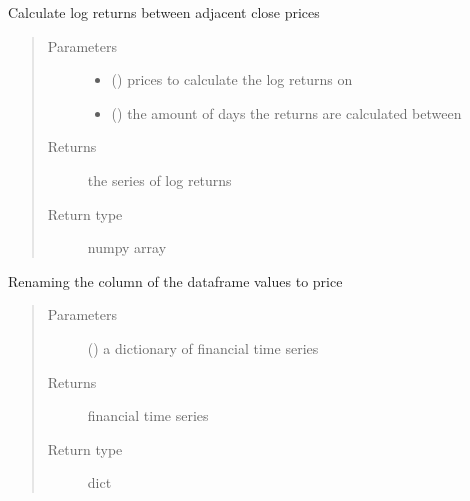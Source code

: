 \documentclass[letterpaper,10pt,english]{sphinxmanual}
\begin{document}
\begin{fulllineitems}
\label{\detokenize{index:Src.preprocessing.log_returns}}
Calculate log returns between adjacent close prices
\begin{quote}\begin{description}
\item[{Parameters}] \leavevmode\begin{itemize}
\item {} 
 () \textendash{} prices to calculate the log returns on

\item {} 
 () \textendash{} the amount of days the returns are calculated between

\end{itemize}

\item[{Returns}] \leavevmode
the series of log returns

\item[{Return type}] \leavevmode
numpy array

\end{description}\end{quote}

\end{fulllineitems}


\begin{fulllineitems}
\label{\detokenize{index:Src.preprocessing.price_rename}}
Renaming the column of the dataframe values to price
\begin{quote}\begin{description}
\item[{Parameters}] \leavevmode
{} () \textendash{} a dictionary of financial time series

\item[{Returns}] \leavevmode
financial time series

\item[{Return type}] \leavevmode
dict

\end{description}\end{quote}

\end{fulllineitems}
\end{document}
